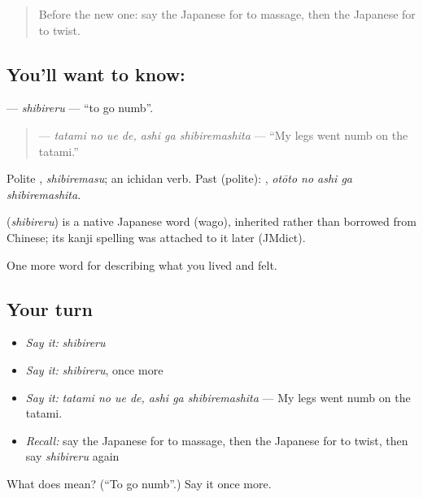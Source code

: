 \begin{quote}
Before the new one: say the Japanese for to massage, then the Japanese for to twist.
\end{quote}

\subsection*{You'll want to know: }
\textbf{} — \emph{shibireru} — \textquotedblleft{}to go numb\textquotedblright{}.

\begin{quote}
\textbf{  } — \emph{tatami no ue de, ashi ga shibiremashita} — \textquotedblleft{}My legs went numb on the tatami.\textquotedblright{}
\end{quote}

Polite \textbf{}, \emph{shibiremasu}; an ichidan verb. Past (polite): \textbf{  }, \emph{otōto no ashi ga shibiremashita}.

\begin{cousinweb}
\textbf{} (\emph{shibireru}) is a native Japanese word (wago), inherited rather than borrowed from Chinese; its kanji spelling was attached to it later (JMdict).
\end{cousinweb}

\begin{grammarlens}[title={What you've built}]
One more word for describing what you lived and felt.
\end{grammarlens}

\subsection*{Your turn}
\begin{itemize}
\raggedright
  \item \emph{Say it:} \emph{shibireru}
  \item \emph{Say it:} \emph{shibireru}, once more
  \item \emph{Say it:} \emph{tatami no ue de, ashi ga shibiremashita} — My legs went numb on the tatami.
  \item \emph{Recall:} say the Japanese for to massage, then the Japanese for to twist, then say \emph{shibireru} again
\end{itemize}

\begin{tcolorbox}[breakable,colback=teal!4,colframe=teal!35!black,title={Before you move on}]
What does  mean? (\textquotedblleft{}To go numb\textquotedblright{}.) Say it once more.
\end{tcolorbox}
